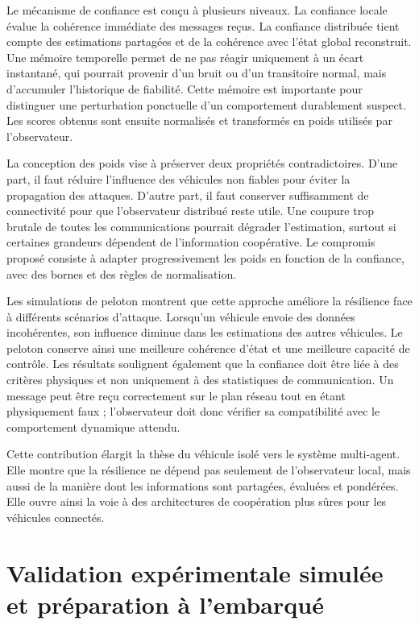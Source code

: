 Le mécanisme de confiance est conçu à plusieurs niveaux. La confiance locale évalue la cohérence immédiate des messages reçus. La confiance distribuée tient compte des estimations partagées et de la cohérence avec l'état global reconstruit. Une mémoire temporelle permet de ne pas réagir uniquement à un écart instantané, qui pourrait provenir d'un bruit ou d'un transitoire normal, mais d'accumuler l'historique de fiabilité. Cette mémoire est importante pour distinguer une perturbation ponctuelle d'un comportement durablement suspect. Les scores obtenus sont ensuite normalisés et transformés en poids utilisés par l'observateur.

La conception des poids vise à préserver deux propriétés contradictoires. D'une part, il faut réduire l'influence des véhicules non fiables pour éviter la propagation des attaques. D'autre part, il faut conserver suffisamment de connectivité pour que l'observateur distribué reste utile. Une coupure trop brutale de toutes les communications pourrait dégrader l'estimation, surtout si certaines grandeurs dépendent de l'information coopérative. Le compromis proposé consiste à adapter progressivement les poids en fonction de la confiance, avec des bornes et des règles de normalisation.

Les simulations de peloton montrent que cette approche améliore la résilience face à différents scénarios d'attaque. Lorsqu'un véhicule envoie des données incohérentes, son influence diminue dans les estimations des autres véhicules. Le peloton conserve ainsi une meilleure cohérence d'état et une meilleure capacité de contrôle. Les résultats soulignent également que la confiance doit être liée à des critères physiques et non uniquement à des statistiques de communication. Un message peut être reçu correctement sur le plan réseau tout en étant physiquement faux ; l'observateur doit donc vérifier sa compatibilité avec le comportement dynamique attendu.

Cette contribution élargit la thèse du véhicule isolé vers le système multi-agent. Elle montre que la résilience ne dépend pas seulement de l'observateur local, mais aussi de la manière dont les informations sont partagées, évaluées et pondérées. Elle ouvre ainsi la voie à des architectures de coopération plus sûres pour les véhicules connectés.

\section*{Validation expérimentale simulée et préparation à l'embarqué}

